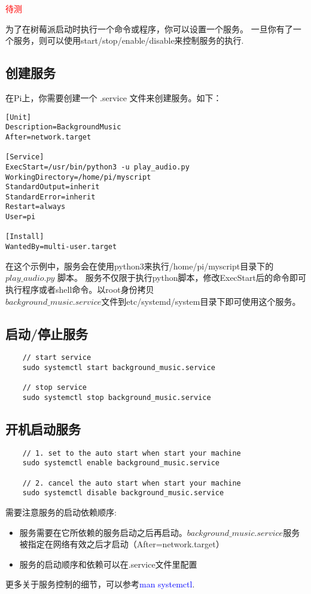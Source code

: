\textcolor{red}{待测}\par
为了在树莓派启动时执行一个命令或程序，你可以设置一个服务。
一旦你有了一个服务，则可以使用start/stop/enable/disable来控制服务的执行. 
\subsection{创建服务}
在Pi上，你需要创建一个 .service 文件来创建服务。如下：
\begin{lstlisting}[title=$background_music.service$]
[Unit]
Description=BackgroundMusic
After=network.target

[Service]
ExecStart=/usr/bin/python3 -u play_audio.py
WorkingDirectory=/home/pi/myscript
StandardOutput=inherit
StandardError=inherit
Restart=always
User=pi

[Install]
WantedBy=multi-user.target
\end{lstlisting}
在这个示例中，服务会在使用python3来执行/home/pi/myscript目录下的 $play\_audio.py$ 脚本。
服务不仅限于执行python脚本，修改ExecStart后的命令即可执行程序或者shell命令。以root身份拷贝 \\
$background\_music.service$文件到etc/systemd/system目录下即可使用这个服务。

\subsection{启动/停止服务}
\begin{lstlisting}
    // start service
    sudo systemctl start background_music.service

    // stop service
    sudo systemctl stop background_music.service
\end{lstlisting}
\subsection{开机启动服务}
\begin{lstlisting}
    // 1. set to the auto start when start your machine
    sudo systemctl enable background_music.service

    // 2. cancel the auto start when start your machine
    sudo systemctl disable background_music.service
\end{lstlisting}
需要注意服务的启动依赖顺序: 
\begin{itemize}
    \item 服务需要在它所依赖的服务启动之后再启动。$background\_music.service$服务被指定在网络有效之后才启动（After=network.target）
    \item 服务的启动顺序和依赖可以在.service文件里配置
\end{itemize}
更多关于服务控制的细节，可以参考\textcolor{blue}{man systemctl}.